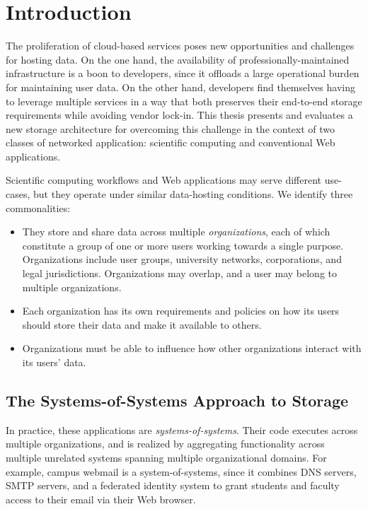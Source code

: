 \chapter{Introduction}
\label{chap:introduction}

The proliferation of cloud-based services poses new opportunities and
challenges for hosting data.  On the one hand, the availability of
professionally-maintained infrastructure is a boon to developers, since it
offloads a large operational burden for maintaining user data.  On the other
hand, developers find themselves having to leverage multiple services in a way
that both preserves their end-to-end storage requirements while
avoiding vendor lock-in.  This thesis presents and evaluates a new storage
architecture for overcoming this challenge in the context of two classes of
networked application: scientific computing and conventional Web
applications.

Scientific computing workflows and Web applications may
serve different use-cases, but they operate under similar data-hosting
conditions.  We identify three commonalities:

\begin{itemize}

\item They store and share data across multiple \emph{organizations},
each of which constitute a group of one or more users working towards
a single purpose.  Organizations include 
user groups, university networks, corporations, and
legal jurisdictions.  Organizations may overlap, and a user may belong to
multiple organizations.

\item Each organization has its own requirements and policies
on how its users should store their data and make it available to others.

\item Organizations must be able to influence how other organizations interact
with its users' data.

\end{itemize}

\section{The Systems-of-Systems Approach to Storage}

In practice, these applications are \emph{systems-of-systems}.  Their code
executes across multiple organizations, and is realized by aggregating
functionality across multiple unrelated systems spanning multiple organizational
domains.  For example, campus webmail is a system-of-systems, since it combines DNS
servers, SMTP servers, and a federated identity system to grant students and
faculty access to their email via their Web browser.

